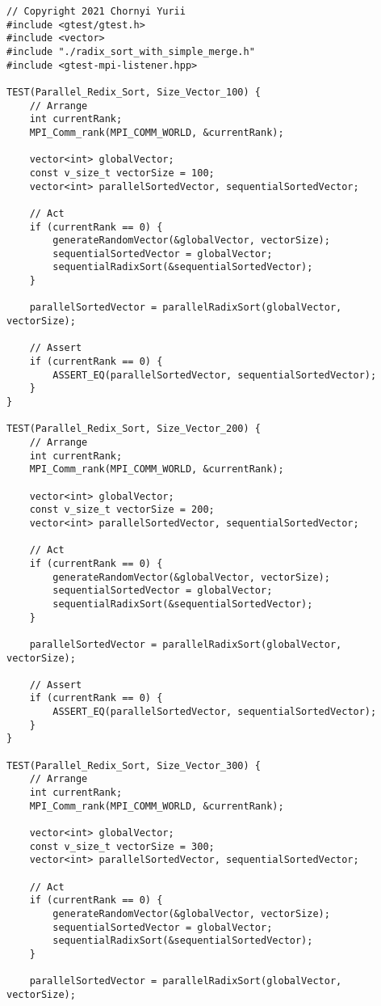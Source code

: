\documentclass{report}
\begin{document}
\begin{lstlisting}
// Copyright 2021 Chornyi Yurii
#include <gtest/gtest.h>
#include <vector>
#include "./radix_sort_with_simple_merge.h"
#include <gtest-mpi-listener.hpp>

TEST(Parallel_Redix_Sort, Size_Vector_100) {
    // Arrange
    int currentRank;
    MPI_Comm_rank(MPI_COMM_WORLD, &currentRank);

    vector<int> globalVector;
    const v_size_t vectorSize = 100;
    vector<int> parallelSortedVector, sequentialSortedVector;

    // Act
    if (currentRank == 0) {
        generateRandomVector(&globalVector, vectorSize);
        sequentialSortedVector = globalVector;
        sequentialRadixSort(&sequentialSortedVector);
    }

    parallelSortedVector = parallelRadixSort(globalVector, vectorSize);

    // Assert
    if (currentRank == 0) {
        ASSERT_EQ(parallelSortedVector, sequentialSortedVector);
    }
}

TEST(Parallel_Redix_Sort, Size_Vector_200) {
    // Arrange
    int currentRank;
    MPI_Comm_rank(MPI_COMM_WORLD, &currentRank);

    vector<int> globalVector;
    const v_size_t vectorSize = 200;
    vector<int> parallelSortedVector, sequentialSortedVector;

    // Act
    if (currentRank == 0) {
        generateRandomVector(&globalVector, vectorSize);
        sequentialSortedVector = globalVector;
        sequentialRadixSort(&sequentialSortedVector);
    }

    parallelSortedVector = parallelRadixSort(globalVector, vectorSize);

    // Assert
    if (currentRank == 0) {
        ASSERT_EQ(parallelSortedVector, sequentialSortedVector);
    }
}

TEST(Parallel_Redix_Sort, Size_Vector_300) {
    // Arrange
    int currentRank;
    MPI_Comm_rank(MPI_COMM_WORLD, &currentRank);

    vector<int> globalVector;
    const v_size_t vectorSize = 300;
    vector<int> parallelSortedVector, sequentialSortedVector;

    // Act
    if (currentRank == 0) {
        generateRandomVector(&globalVector, vectorSize);
        sequentialSortedVector = globalVector;
        sequentialRadixSort(&sequentialSortedVector);
    }

    parallelSortedVector = parallelRadixSort(globalVector, vectorSize);


\end{lstlisting}
\end{document}
